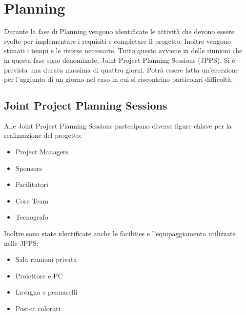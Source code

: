 \chapter{Planning}
Durante la fase di Planning vengono identificate le attività che devono essere svolte per 
implementare i requisiti e completare il progetto. Inoltre vengono stimati i tempi e le 
risorse necessarie. 
Tutto questo avviene in delle riunioni che in questa fase sono denominate, Joint Project 
Planning Sessions (JPPS).
Si è prevista una durata massima di quattro giorni. Potrà essere fatta un'eccezione per
l'aggiunta di un giorno nel caso in cui si riscontrino particolari difficoltà.

\section{Joint Project Planning Sessions}
Alle Joint Project Planning Sessions partecipano diverse figure chiave per la realizzazione 
del progetto:
\begin{itemize}
    \item Project Managers
    \item Sponsors
    \item Facilitatori
    \item Core Team
    \item Tecnografo
\end{itemize}

Inoltre sono state identificate anche le facilities e l'equipaggiamento utilizzate nelle JPPS:
\begin{itemize}
    \item Sala riunioni privata
    \item Proiettore e PC 
    \item Lavagna e pennarelli
    \item Post-it colorati
\end{itemize}

